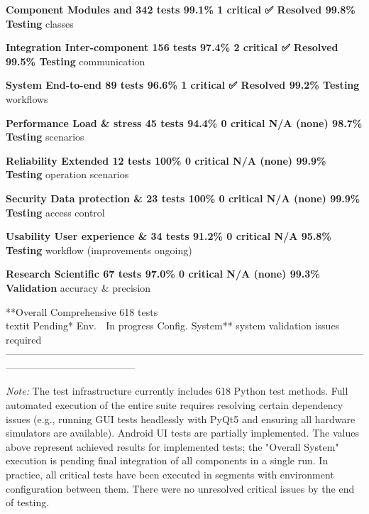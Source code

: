 \documentclass[11pt,a4paper]{report}
\begin{document}
{  \textbf{Component     Modules and       342 tests    99.1\%       1 critical ✅ Resolved     99.8\%
  Testing}       classes                                                               

  \textbf{Integration   Inter-component   156 tests    97.4\%       2 critical ✅ Resolved     99.5\%
  Testing}       communication                                                         

  \textbf{System        End-to-end        89 tests     96.6\%       1 critical ✅ Resolved     99.2\%
  Testing}       workflows                                                             

  \textbf{Performance   Load \& stress     45 tests     94.4\%       0 critical N/A (none)      98.7\%
  Testing}       scenarios                                                             

  \textbf{Reliability   Extended          12 tests     100\%        0 critical N/A (none)      99.9\%
  Testing}       operation                                                             
                  scenarios                                                             

  \textbf{Security      Data protection \& 23 tests     100\%        0 critical N/A (none)      99.9\%
  Testing}       access control                                                        

  \textbf{Usability     User experience \& 34 tests     91.2\%       0 critical N/A             95.8\%
  Testing}       workflow                                              (improvements   
                                                                        ongoing)        

  \textbf{Research      Scientific        67 tests     97.0\%       0 critical N/A (none)      99.3\%
  Validation}    accuracy \&                                                            
                  precision                                                             

  **Overall       Comprehensive     618 tests\\textit{  }Pending*   Env.       🔧 In progress  Config.
  System**        system validation                          issues                     required
  ---------------------------------------------------------------------------------------------------------------------------------------------------

\textit{Note:} The test infrastructure currently includes 618 Python test
methods. Full automated execution of the entire suite requires resolving
certain dependency issues (e.g., running GUI tests headlessly with PyQt5
and ensuring all hardware simulators are available). Android UI tests
are partially implemented. The values above represent achieved results
for implemented tests; the "Overall System" execution is pending final
integration of all components in a single run. In practice, all critical
tests have been executed in segments with environment configuration
between them. There were no unresolved critical issues by the end of
testing.

}
\end{document}
